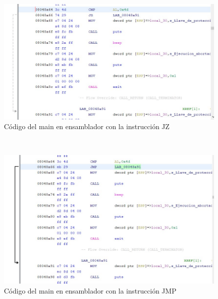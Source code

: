 \documentclass{article}
\begin{document}
\begin{figure}[h!]
    \centering
    \includegraphics[scale=0.9]{images/codigoMainViejo.jpg}
    \caption{Código del main en ensamblador con la instrucción JZ}
    \label{fig:JZ}
\end{figure}\\

\begin{figure}[h!]
    \centering
    \includegraphics[scale=0.9]{images/cambioLLaveHW.jpg}
    \caption{Código del main en ensamblador con la instrucción JMP}
    \label{fig:JMP}
\end{figure}\\
\end{document}
